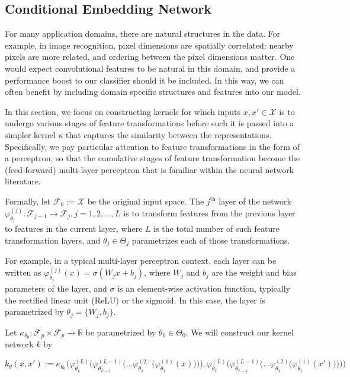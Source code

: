 \documentclass{llncs}
\numberwithin{equation}{section}
\numberwithin{table}{section}
\numberwithin{algorithm}{section}
\begin{document}
	\subsection{Conditional Embedding Network}
	\label{app:conditional_embedding_network}
	
	For many application domains, there are natural structures in the data. For example, in image recognition, pixel dimensions are spatially correlated: nearby pixels are more related, and ordering between the pixel dimensions matter. One would expect convolutional features \citep{lecun1998gradient} to be natural in this domain, and provide a performance boost to our classifier should it be included. In this way, we can often benefit by including domain specific structures and features into our model.
	
	In this section, we focus on constructing kernels for which inputs $x, x' \in \mathcal{X}$ is to undergo various stages of feature transformations before such it is passed into a simpler kernel $\kappa$ that captures the similarity between the representations. Specifically, we pay particular attention to feature transformations in the form of a perceptron, so that the cumulative stages of feature transformation become the (feed-forward) multi-layer perceptron that is familiar within the neural network literature.
	
	Formally, let $\mathcal{F}_{0} := \mathcal{X}$ be the original input space. The $j^{\mathrm{th}}$ layer of the network $\varphi^{(j)}_{\theta_{j}} : \mathcal{F}_{j - 1} \to \mathcal{F}_{j}, j = 1, 2, \dots, L$ is to transform features from the previous layer to features in the current layer, where $L$ is the total number of such feature transformation layers, and $\theta_{j} \in \Theta_{j}$ parametrizes each of those transformations.
	
	For example, in a typical multi-layer perceptron context, each layer can be written as $\varphi^{(j)}_{\theta_{j}}(x) = \sigma(W_{j} x + b_{j})$, where $W_{j}$ and $b_{j}$ are the weight and bias parameters of the layer, and $\sigma$ is an element-wise activation function, typically the rectified linear unit (ReLU) or the sigmoid. In this case, the layer is parametrized by $\theta_{j} = \{W_{j}, b_{j}\}$.
	
	Let $\kappa_{\theta_{0}} : \mathcal{F}_{p} \times \mathcal{F}_{p} \to \mathbb{R}$ be parametrized by $\theta_{0} \in \Theta_{0}$. We will construct our kernel network $k$ by
	
	\begin{equation}
	k_{\theta}(x, x') := \kappa_{\theta_{0}}\Bigg( \varphi^{(L)}_{\theta_{L}}\bigg(\varphi^{(L - 1)}_{\theta_{L - 1}}\Big(\dots\varphi^{(2)}_{\theta_{2}}\big(\varphi^{(1)}_{\theta_{1}}(x)\big)\Big)\bigg), \varphi^{(L)}_{\theta_{L}}\bigg(\varphi^{(L - 1)}_{\theta_{L - 1}}\Big(\dots\varphi^{(2)}_{\theta_{2}}\big(\varphi^{(1)}_{\theta_{1}}(x')\big)\Big)\bigg) \Bigg)
	\label{eq:deep_conditional_embedding_network}
	\end{equation}
	
\end{document}
